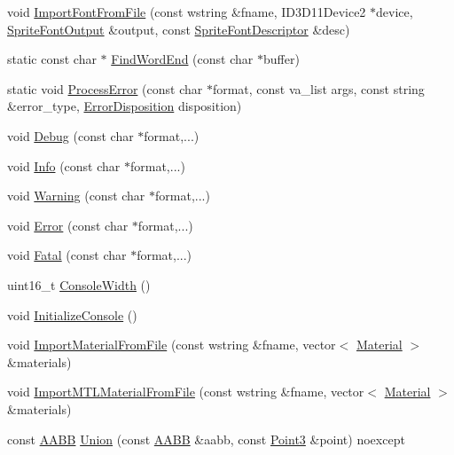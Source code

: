 \begin{DoxyCompactItemize}
\item 
void \hyperlink{namespacemage_a23fecd103cda79e7c9fd5cf372ae5e9f}{Import\+Font\+From\+File} (const wstring \&fname, I\+D3\+D11\+Device2 $\ast$device, \hyperlink{structmage_1_1_sprite_font_output}{Sprite\+Font\+Output} \&output, const \hyperlink{structmage_1_1_sprite_font_descriptor}{Sprite\+Font\+Descriptor} \&desc)
\item 
static const char $\ast$ \hyperlink{namespacemage_a81ebde51f9da00dd6fad364a2c5017cb}{Find\+Word\+End} (const char $\ast$buffer)
\item 
static void \hyperlink{namespacemage_ab248f74af47acacc1306e875fb19a9ce}{Process\+Error} (const char $\ast$format, const va\+\_\+list args, const string \&error\+\_\+type, \hyperlink{namespacemage_a7146b3c3db53179eeb32bf4d51934715}{Error\+Disposition} disposition)
\item 
void \hyperlink{namespacemage_a1bcf1f0301e170105908eee5b5c46830}{Debug} (const char $\ast$format,...)
\item 
void \hyperlink{namespacemage_add6aa5f13960ce07b20f48d273956a91}{Info} (const char $\ast$format,...)
\item 
void \hyperlink{namespacemage_a0eccd8065c75d5f2bf86b48a5be3bfe5}{Warning} (const char $\ast$format,...)
\item 
void \hyperlink{namespacemage_a52a7fe8c9ce39afd9e0b0299373db0fa}{Error} (const char $\ast$format,...)
\item 
void \hyperlink{namespacemage_aefd40c91591a8e0423e4222b4a5e6249}{Fatal} (const char $\ast$format,...)
\item 
uint16\+\_\+t \hyperlink{namespacemage_a2988e0e46e373691a189ea97135f1ed1}{Console\+Width} ()
\item 
void \hyperlink{namespacemage_a587146c8cbeed655be16ddff8435c05c}{Initialize\+Console} ()
\item 
void \hyperlink{namespacemage_a1ec5e042dc875b6f9ec5e2f15c7d6320}{Import\+Material\+From\+File} (const wstring \&fname, vector$<$ \hyperlink{structmage_1_1_material}{Material} $>$ \&materials)
\item 
void \hyperlink{namespacemage_af823dc7245aa79b1e789ac8f58d766d2}{Import\+M\+T\+L\+Material\+From\+File} (const wstring \&fname, vector$<$ \hyperlink{structmage_1_1_material}{Material} $>$ \&materials)
\item 
const \hyperlink{structmage_1_1_a_a_b_b}{A\+A\+BB} \hyperlink{namespacemage_a1107fb2b389832ac762ab4905c578e8b}{Union} (const \hyperlink{structmage_1_1_a_a_b_b}{A\+A\+BB} \&aabb, const \hyperlink{structmage_1_1_point3}{Point3} \&point) noexcept

\end{DoxyCompactItemize}
